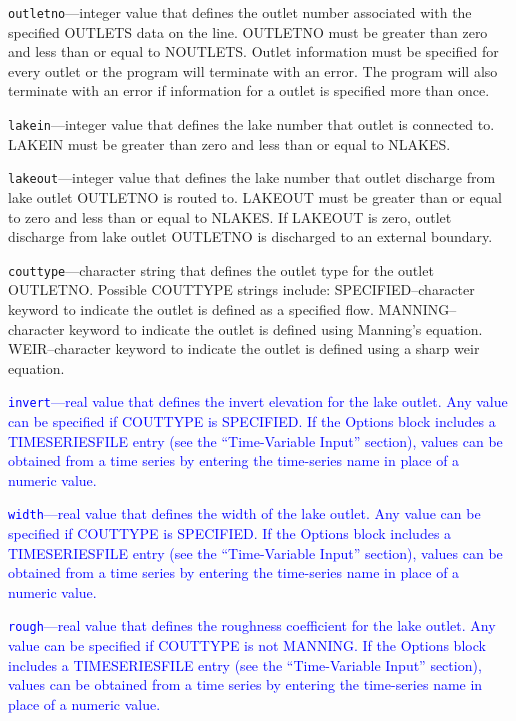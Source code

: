 \begin{description}
\item \texttt{outletno}---integer value that defines the outlet number associated with the specified OUTLETS data on the line. OUTLETNO must be greater than zero and less than or equal to NOUTLETS. Outlet information must be specified for every outlet or the program will terminate with an error. The program will also terminate with an error if information for a outlet is specified more than once.

\item \texttt{lakein}---integer value that defines the lake number that outlet is connected to. LAKEIN must be greater than zero and less than or equal to NLAKES.

\item \texttt{lakeout}---integer value that defines the lake number that outlet discharge from lake outlet OUTLETNO is routed to. LAKEOUT must be greater than or equal to zero and less than or equal to NLAKES. If LAKEOUT is zero, outlet discharge from lake outlet OUTLETNO is discharged to an external boundary.

\item \texttt{couttype}---character string that defines the outlet type for the outlet OUTLETNO. Possible COUTTYPE strings include: SPECIFIED--character keyword to indicate the outlet is defined as a specified flow.  MANNING--character keyword to indicate the outlet is defined using Manning's equation. WEIR--character keyword to indicate the outlet is defined using a sharp weir equation.

\item \textcolor{blue}{\texttt{invert}---real value that defines the invert elevation for the lake outlet. Any value can be specified if COUTTYPE is SPECIFIED. If the Options block includes a TIMESERIESFILE entry (see the ``Time-Variable Input'' section), values can be obtained from a time series by entering the time-series name in place of a numeric value.}

\item \textcolor{blue}{\texttt{width}---real value that defines the width of the lake outlet. Any value can be specified if COUTTYPE is SPECIFIED. If the Options block includes a TIMESERIESFILE entry (see the ``Time-Variable Input'' section), values can be obtained from a time series by entering the time-series name in place of a numeric value.}

\item \textcolor{blue}{\texttt{rough}---real value that defines the roughness coefficient for the lake outlet. Any value can be specified if COUTTYPE is not MANNING. If the Options block includes a TIMESERIESFILE entry (see the ``Time-Variable Input'' section), values can be obtained from a time series by entering the time-series name in place of a numeric value.}


\end{description}
